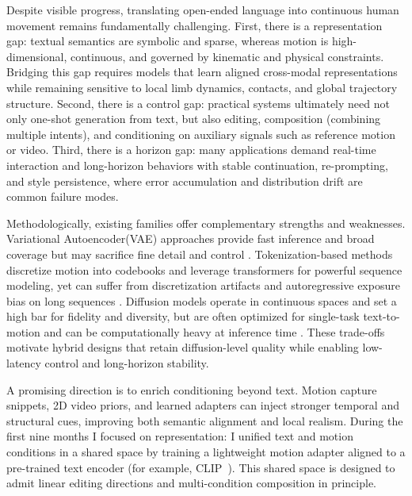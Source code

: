 \documentclass[a4paper,12pt]{article}
\begin{document}
Despite visible progress, translating open-ended language into continuous human movement remains fundamentally challenging. First, there is a representation gap: textual semantics are symbolic and sparse, whereas motion is high-dimensional, continuous, and governed by kinematic and physical constraints. Bridging this gap requires models that learn aligned cross-modal representations while remaining sensitive to local limb dynamics, contacts, and global trajectory structure. Second, there is a control gap: practical systems ultimately need not only one-shot generation from text, but also editing, composition (combining multiple intents), and conditioning on auxiliary signals such as reference motion or video. Third, there is a horizon gap: many applications demand real-time interaction and long-horizon behaviors with stable continuation, re-prompting, and style persistence, where error accumulation and distribution drift are common failure modes.

Methodologically, existing families offer complementary strengths and weaknesses. Variational Autoencoder(VAE) approaches provide fast inference and broad coverage but may sacrifice fine detail and control \cite{kingma2013auto,petrovich2022temos}. Tokenization-based methods discretize motion into codebooks and leverage transformers for powerful sequence modeling, yet can suffer from discretization artifacts and autoregressive exposure bias on long sequences \cite{zhang2023generating,jiang2024motiongpt}. Diffusion models operate in continuous spaces and set a high bar for fidelity and diversity, but are often optimized for single-task text-to-motion and can be computationally heavy at inference time \cite{sohl2015deep,tevet2022human,chen2023executing,zhang2024motiondiffuse}. These trade-offs motivate hybrid designs that retain diffusion-level quality while enabling low-latency control and long-horizon stability.

A promising direction is to enrich conditioning beyond text. Motion capture snippets, 2D video priors, and learned adapters can inject stronger temporal and structural cues, improving both semantic alignment and local realism. During the first nine months I focused on representation: I unified text and motion conditions in a shared space by training a lightweight motion adapter aligned to a pre-trained text encoder (for example, CLIP~\cite{radford2021learning}). This shared space is designed to admit linear editing directions and multi-condition composition in principle.
\end{document}
